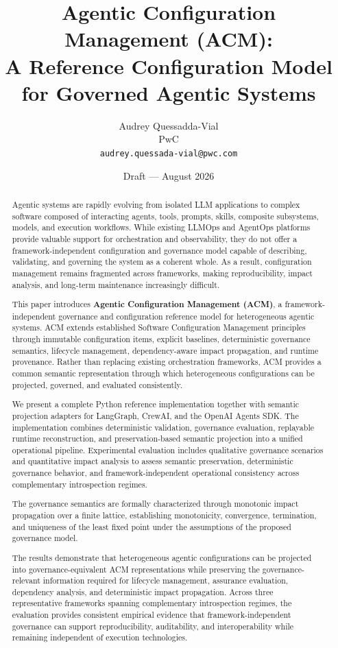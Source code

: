 \documentclass[10pt]{article}
\title{\textbf{Agentic Configuration Management (ACM):\\A Reference Configuration Model for Governed Agentic Systems}}
\author{
  Audrey Quessadda-Vial\\
  PwC\\
  \texttt{audrey.quessada-vial@pwc.com}
}
\date{Draft --- August 2026}
\begin{document}
\maketitle

\begin{abstract}

Agentic systems are rapidly evolving from isolated LLM applications to complex software composed of interacting agents, tools, prompts, skills, composite subsystems, models, and execution workflows. While existing LLMOps and AgentOps platforms provide valuable support for orchestration and observability, they do not offer a framework-independent configuration and governance model capable of describing, validating, and governing the system as a coherent whole. As a result, configuration management remains fragmented across frameworks, making reproducibility, impact analysis, and long-term maintenance increasingly difficult.

This paper introduces \textbf{Agentic Configuration Management (ACM)}, a framework-independent governance and configuration reference model for heterogeneous agentic systems. ACM extends established Software Configuration Management principles through immutable configuration items, explicit baselines, deterministic governance semantics, lifecycle management, dependency-aware impact propagation, and runtime provenance. Rather than replacing existing orchestration frameworks, ACM provides a common semantic representation through which heterogeneous configurations can be projected, governed, and evaluated consistently.

We present a complete Python reference implementation together with semantic projection adapters for LangGraph, CrewAI, and the OpenAI Agents SDK. The implementation combines deterministic validation, governance evaluation, replayable runtime reconstruction, and preservation-based semantic projection into a unified operational pipeline. Experimental evaluation includes qualitative governance scenarios and quantitative impact analysis to assess semantic preservation, deterministic governance behavior, and framework-independent operational consistency across complementary introspection regimes.

The governance semantics are formally characterized through monotonic impact propagation over a finite lattice, establishing monotonicity, convergence, termination, and uniqueness of the least fixed point under the assumptions of the proposed governance model.

The results demonstrate that heterogeneous agentic configurations can be projected into governance-equivalent ACM representations while preserving the governance-relevant information required for lifecycle management, assurance evaluation, dependency analysis, and deterministic impact propagation. Across three representative frameworks spanning complementary introspection regimes, the evaluation provides consistent empirical evidence that framework-independent governance can support reproducibility, auditability, and interoperability while remaining independent of execution technologies.

\end{abstract}
\end{document}
